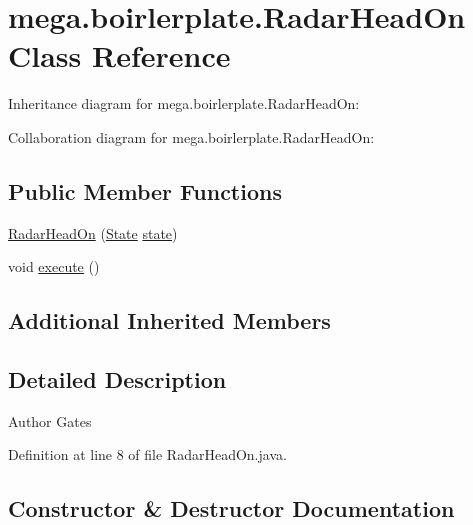 \hypertarget{classmega_1_1boirlerplate_1_1_radar_head_on}{}\section{mega.\+boirlerplate.\+Radar\+Head\+On Class Reference}
\label{classmega_1_1boirlerplate_1_1_radar_head_on}


Inheritance diagram for mega.\+boirlerplate.\+Radar\+Head\+On\+:


Collaboration diagram for mega.\+boirlerplate.\+Radar\+Head\+On\+:
\subsection*{Public Member Functions}
\begin{DoxyCompactItemize}
\item 
\hyperlink{classmega_1_1boirlerplate_1_1_radar_head_on_ac0f9bdef37873bea18af93dfd485808b}{Radar\+Head\+On} (\hyperlink{classmega_1_1boirlerplate_1_1_state}{State} \hyperlink{classmega_1_1boirlerplate_1_1_component_a87b0d70f323b5fee60a200e07c9c20fd}{state})
\item 
void \hyperlink{classmega_1_1boirlerplate_1_1_radar_head_on_a910654d116a39c27d292835063b30d20}{execute} ()
\end{DoxyCompactItemize}
\subsection*{Additional Inherited Members}


\subsection{Detailed Description}
\begin{DoxyAuthor}{Author}
Gates 
\end{DoxyAuthor}


Definition at line 8 of file Radar\+Head\+On.\+java.



\subsection{Constructor \& Destructor Documentation}
\mbox{\label{classmega_1_1boirlerplate_1_1_radar_head_on_ac0f9bdef37873bea18af93dfd485808b}} 
